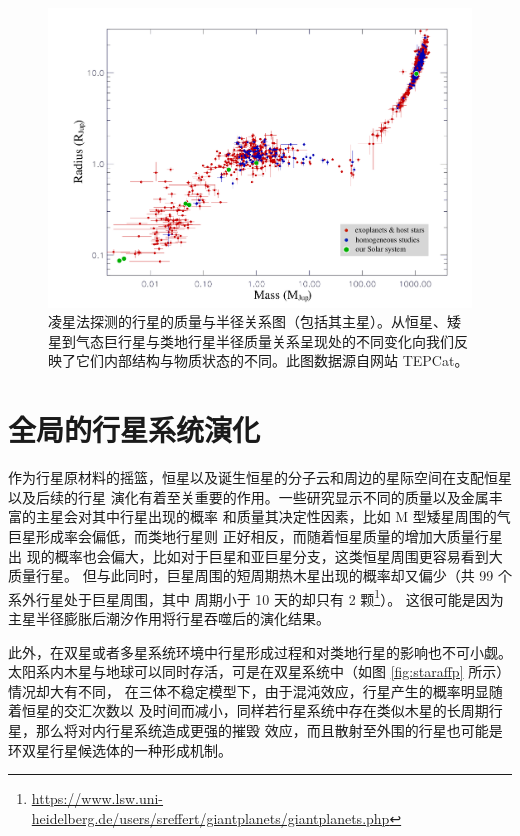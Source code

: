 \begin{figure}[t]
\centering
\includegraphics[width=1.0\textwidth]{figures/chapter5/fig2_massrad.pdf}
\caption{凌星法探测的行星的质量与半径关系图（包括其主星）。从恒星、矮星到气态巨行星与类地行星半径质量关系呈现处的不同变化向我们反映了它们内部结构与物质状态的不同。此图数据源自网站 TEPCat。}
\label{fig:massrad}
\end{figure}
 

\section{全局的行星系统演化} \label{sec:fateofplanets}

作为行星原材料的摇篮，恒星以及诞生恒星的分子云和周边的星际空间在支配恒星以及后续的行星
演化有着至关重要的作用。一些研究显示不同的质量以及金属丰富的主星会对其中行星出现的概率
和质量其决定性因素\cite{Fischer2005}，比如 M 型矮星周围的气巨星形成率会偏低，而类地行星则
正好相反\cite{Johnson2007b,Cumming2008,Kennedy2008}，而随着恒星质量的增加大质量行星出
现的概率也会偏大，比如对于巨星和亚巨星分支，这类恒星周围更容易看到大质量行星\cite{Johnson2007}。
但与此同时，巨星周围的短周期热木星出现的概率却又偏少（共 99 个系外行星处于巨星周围，其中
周期小于 10 天的却只有 2 颗\footnote{\url{https://www.lsw.uni-heidelberg.de/users/sreffert/giantplanets/giantplanets.php}}）。
这很可能是因为主星半径膨胀后潮汐作用将行星吞噬后的演化结果\cite{Sato2008,LilloBox2016}。


此外，在双星或者多星系统环境中行星形成过程和对类地行星的影响也不可小觑\cite{Desidera2007}。
太阳系内木星与地球可以同时存活，可是在双星系统中（如图 \ref{fig:staraffp} 所示）情况却大有不同，
在三体不稳定模型下\cite{Marzari2007}，由于混沌效应，行星产生的概率明显随着恒星的交汇次数以
及时间而减小，同样若行星系统中存在类似木星的长周期行星，那么将对内行星系统造成更强的摧毁
效应，而且散射至外围的行星也可能是环双星行星候选体的一种形成机制\cite{Gong2013}。


